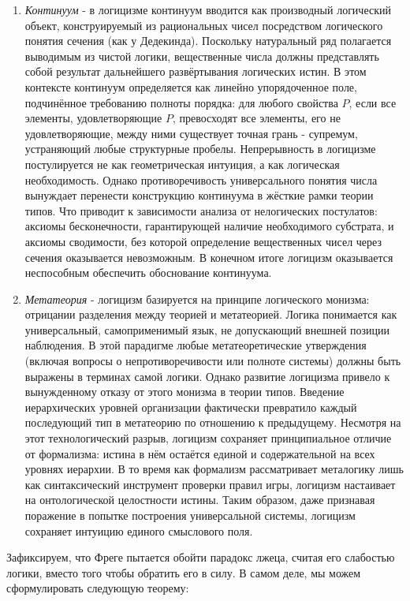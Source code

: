 \documentclass[12pt]{article}
\begin{document}
\begin{enumerate}
    \item {\it Континуум} - в логицизме континуум вводится как производный логический объект, конструируемый из рациональных чисел посредством логического понятия сечения (как у Дедекинда). Поскольку натуральный ряд полагается выводимым из чистой логики, вещественные числа должны представлять собой результат дальнейшего развёртывания логических истин. В этом контексте континуум определяется как линейно упорядоченное поле, подчинённое требованию полноты порядка: для любого свойства $P$, если все элементы, удовлетворяющие $P$, превосходят все элементы, его не удовлетворяющие, между ними существует точная грань - супремум, устраняющий любые структурные пробелы. Непрерывность в логицизме постулируется не как геометрическая интуиция, а как логическая необходимость. Однако противоречивость универсального понятия числа вынуждает перенести конструкцию континуума в жёсткие рамки теории типов. Что приводит к зависимости анализа от нелогических постулатов: аксиомы бесконечности, гарантирующей наличие необходимого субстрата, и аксиомы сводимости, без которой определение вещественных чисел через сечения оказывается невозможным. В конечном итоге логицизм оказывается неспособным обеспечить обоснование континуума.
    \item {\it Метатеория} - логицизм базируется на принципе логического монизма: отрицании разделения между теорией и метатеорией. Логика понимается как универсальный, самоприменимый язык, не допускающий внешней позиции наблюдения. В этой парадигме любые метатеоретические утверждения (включая вопросы о непротиворечивости или полноте системы) должны быть выражены в терминах самой логики. Однако развитие логицизма привело к вынужденному отказу от этого монизма в теории типов. Введение иерархических уровней организации фактически превратило каждый последующий тип в метатеорию по отношению к предыдущему. Несмотря на этот технологический разрыв, логицизм сохраняет принципиальное отличие от формализма: истина в нём остаётся единой и содержательной на всех уровнях иерархии. В то время как формализм рассматривает металогику лишь как синтаксический инструмент проверки правил игры, логицизм настаивает на онтологической целостности истины. Таким образом, даже признавая поражение в попытке построения универсальной системы, логицизм сохраняет интуицию единого смыслового поля.
\end{enumerate}

Зафиксируем, что Фреге пытается обойти парадокс лжеца, считая его слабостью логики, вместо того чтобы обратить его в силу. В самом деле, мы можем сформулировать следующую теорему:
\end{document}
